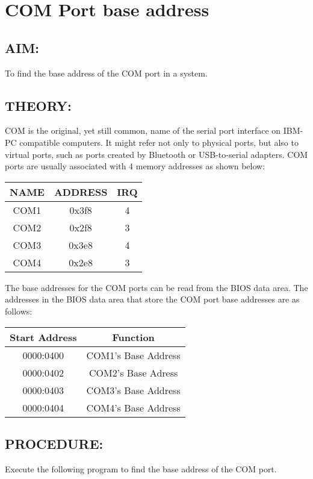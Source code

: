 \chapter{COM Port base address}
%
%
\section*{AIM:}
To find the base address of the COM port in a system.
\section*{THEORY:}
COM is the original, yet still common, name of the serial port interface on IBM-PC compatible computers. It might refer not only to physical ports, but also to virtual ports, such as ports created by Bluetooth or USB-to-serial adapters. COM ports are usually associated with 4 memory addresses as shown below:

\begin{center}
\bgroup
\def\arraystretch{1.5}
\begin{tabular}{ |c|c|c| }
\hline
\textbf{NAME} & \textbf{ADDRESS} & \textbf{IRQ}\\
\hline
COM1 & 0x3f8 & 4\\
\hline
COM2 & 0x2f8 & 3\\
\hline
COM3 & 0x3e8 & 4\\
\hline
COM4 & 0x2e8 & 3\\
\hline
\end{tabular}
\egroup
\end{center}

The base addresses for the COM ports can be read from the BIOS data area. The addresses in the BIOS data
area that store the COM port base addresses are as follows:

\begin{center}
\bgroup
\def\arraystretch{1.5}
\begin{tabular}{ |c|c| }
\hline
\textbf{Start Address} & \textbf{Function}\\
\hline
0000:0400 & COM1's Base Address\\
\hline
0000:0402 & COM2's Base Adress\\
\hline
0000:0403 & COM3's Base Address\\
\hline
0000:0404 & COM4's Base Address\\
\hline
\end{tabular}
\egroup
\end{center}

\section*{PROCEDURE:}
Execute the following program to find the base address of the COM port.

